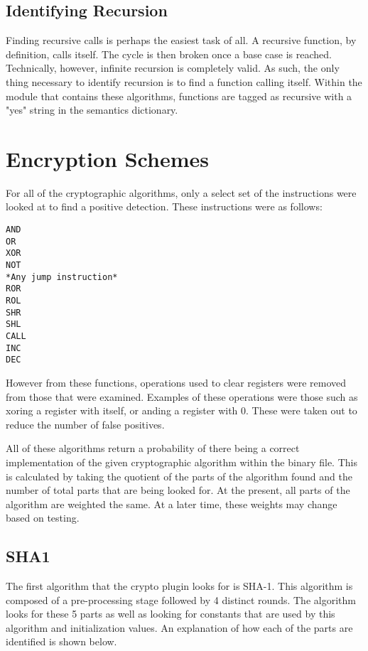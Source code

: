 \documentclass{article}
\begin{document}
\subsection*{Identifying Recursion}
Finding recursive calls is perhaps the easiest task of all.  A recursive function, by definition, calls itself.  The cycle is then broken once
a base case is reached.  Technically, however, infinite recursion is completely valid.  As such, the only thing necessary to identify recursion
is to find a function calling itself.  Within the module that contains these algorithms, functions are tagged as recursive with a "yes" string
in the semantics dictionary. \\


\pagebreak


\section*{Encryption Schemes}
For all of the cryptographic algorithms, only a select set of the instructions
were looked at to find a positive detection. These instructions were as 
follows:\\
\begin{algorithm}
\lstset{language=[mips]Assembler}
\begin{lstlisting}
AND
OR
XOR
NOT
*Any jump instruction*
ROR
ROL
SHR
SHL
CALL
INC
DEC
\end{lstlisting}
\end{algorithm}

However from these functions, operations used to clear registers were removed
from those that were examined. Examples of these operations were those such 
as xoring a register with itself, or anding a register with 0. These were 
taken out to reduce the number of false positives. 

All of these algorithms return a probability of there being a correct 
implementation of the given cryptographic algorithm within the binary file.
This is calculated by taking the quotient of the parts of the algorithm found
and the number of total parts that are being looked for. At the present, all
parts of the algorithm are weighted the same. At a later time, these weights 
may change based on testing.\\

\subsection*{SHA1}
The first algorithm that the crypto plugin looks for is SHA-1. This algorithm
is composed of a pre-processing stage followed by 4 distinct rounds. The 
algorithm looks for these 5 parts as well as looking for constants that are 
used by this algorithm and initialization values. An explanation of how
each of the parts are identified is shown below. \\
\end{document}
